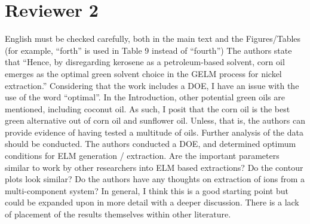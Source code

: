 \documentclass[11pt,answers]{exam}
\begin{document}
\section*{Reviewer 2}
English must be checked carefully, both in the main text and the Figures/Tables (for example, “forth” is used in Table 9 instead of “fourth”)
The authors state that “Hence, by disregarding kerosene as a petroleum-based solvent, corn oil emerges as the optimal green solvent choice in the GELM process for nickel extraction.”  Considering that the work includes a DOE, I have an issue with the use of the word “optimal”.  In the Introduction, other potential green oils are mentioned, including coconut oil.  As such, I posit that the corn oil is the best green alternative out of corn oil and sunflower oil.  Unless, that is, the authors can provide evidence of having tested a multitude of oils.
Further analysis of the data should be conducted.  The authors conducted a DOE, and determined optimum conditions for ELM generation / extraction.  Are the important parameters similar to work by other researchers into ELM based extractions?  Do the contour plots look similar?
Do the authors have any thoughts on extraction of ions from a multi-component system?
In general, I think this is a good starting point but could be expanded upon in more detail with a deeper discussion.  There is a lack of placement of the results themselves within other literature.
\end{document}
